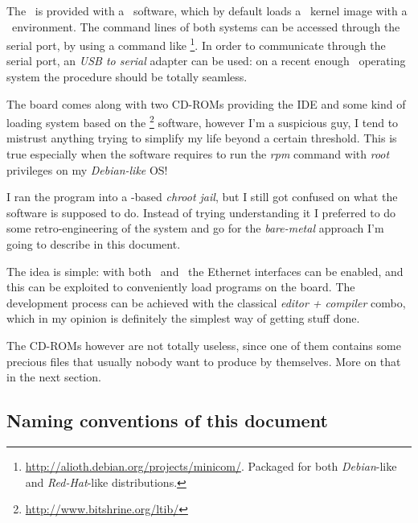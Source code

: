 The \MyBoard\ is provided with a \uBoot\ software, which by default loads
a \Linux\ kernel image with a \BusyBox\ environment. The command lines of
both systems can be accessed through the serial port, by using a command
like \Minicom\footnote{ \url{http://alioth.debian.org/projects/minicom/}.
Packaged for both \emph{Debian}-like and \emph{Red-Hat}-like
distributions.  }. In order to communicate through the serial port, an
\emph{USB to serial} adapter can be used: on a recent enough \GNULinux\
operating system the procedure should be totally seamless.

The board comes along with two CD-ROMs providing the
 IDE and some kind of loading system based on the
\LTIB\footnote{ \url{http://www.bitshrine.org/ltib/} } software, however
I'm a suspicious guy, I tend to mistrust anything trying to simplify my
life beyond a certain threshold.  This is true especially when the
software requires to run the \emph{rpm} command with \emph{root}
privileges on my \emph{Debian-like} OS!

I ran the program into a -based \emph{chroot jail}, but I
still got confused on what the software is supposed to do. Instead of
trying understanding it I preferred to do some retro-engineering of the
system and go for the \emph{bare-metal} approach I'm going to describe in
this document.

The idea is simple: with both \uBoot\ and \Linux\ the Ethernet interfaces
can be enabled, and this can be exploited to conveniently load programs on
the board. The development process can be achieved with the classical
\emph{editor + compiler} combo, which in my opinion is definitely the
simplest way of getting stuff done.

The CD-ROMs however are not totally useless, since one of them contains
some precious files that usually nobody want to produce by themselves.
More on that in the next section.

\subsection{ Naming conventions of this document }

